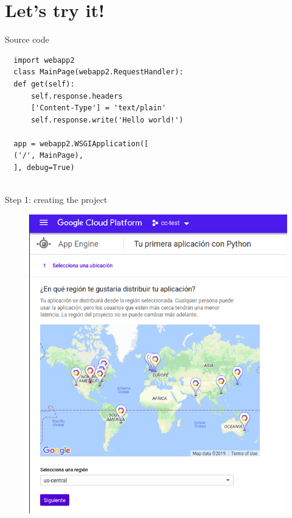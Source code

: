 \documentclass{beamer}
\begin{document}
\section{Let's try it!}



\begin{frame}[fragile]{Source code}
  \begin{verbatim}
  import webapp2
  class MainPage(webapp2.RequestHandler):
  def get(self):
      self.response.headers
      ['Content-Type'] = 'text/plain'
      self.response.write('Hello world!')

  app = webapp2.WSGIApplication([
  ('/', MainPage),
  ], debug=True)


  \end{verbatim}
\end{frame}

\begin{frame}[fragile]{Step 1: creating the project}
    \begin{figure}[H]
      \centering
      \includegraphics[scale=0.4]{img/tutorial/1select_region}
    \end{figure}
\end{frame}
\end{document}
